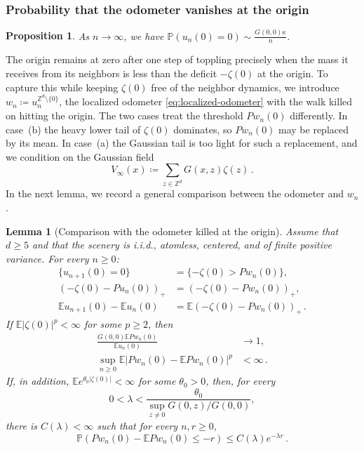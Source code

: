 \documentclass[11pt]{amsart}
\theoremstyle{plain}
\newtheorem{proposition}[theorem]{Proposition}
\newtheorem{lemma}[theorem]{Lemma}
\theoremstyle{definition}
\newcommand{\Z}{\mathbb{Z}}
\newcommand{\E}{\mathbb{E}}
\renewcommand{\P}{\mathbb{P}}
\begin{document}
\subsubsection{Probability that the odometer vanishes at the origin}
	\begin{proposition}\label{prop:dgt4-contact-asymptotics}
		As $n \to \infty$, we have $\P(u_n(0)=0)\sim\frac{G(0,0)\kappa}{n}$.
	\end{proposition}
	The origin remains at zero after one step of toppling precisely when the mass it receives from its neighbors
	is less than the deficit $-\zeta(0)$ at the origin. To capture this while
	keeping $\zeta(0)$ free of the neighbor dynamics, we introduce
	$w_n\coloneqq u_n^{\Z^d\setminus\{0\}}$, the localized odometer
	\eqref{eq:localized-odometer} with the walk killed on hitting the origin. The two cases treat the threshold $Pw_n(0)$ differently. In case~\textup{(b)} the
	heavy lower tail of $\zeta(0)$ dominates, so $Pw_n(0)$ may be replaced by its
	mean. In case~\textup{(a)} the Gaussian tail is too light for such a
	replacement, and we condition on the Gaussian field
	\begin{equation}\label{eq:dgt4-infinite-green-field}
		V_\infty(x)\coloneqq\sum_{z\in\Z^d}G(x,z)\zeta(z)\, .
	\end{equation}
	In the next lemma, we record a general comparison between the odometer and $w_n$.
\begin{lemma}[Comparison with the odometer killed at the origin]\label{lem:dgt4-origin-frozen}
	Assume that $d\geq5$ and that the scenery is i.i.d., atomless, centered,
	and of finite positive variance. For every $n\geq0$:
	\begin{equation}\label{eq:dgt4-origin-fixed-identities}
	\begin{aligned}
		\{u_{n+1}(0)=0\}
		&=\{-\zeta(0)>Pw_n(0)\},\\
		(-\zeta(0)-Pu_n(0))_+
		&=(-\zeta(0)-Pw_n(0))_+,\\
		\E u_{n+1}(0)-\E u_n(0)
		&=\E(-\zeta(0)-Pw_n(0))_+\, .
	\end{aligned}
	\end{equation}
	If $\E|\zeta(0)|^p<\infty$ for some $p\geq2$, then
	\begin{equation}\label{eq:dgt4-origin-fixed-mean}
	\begin{aligned}
		\frac{G(0,0)\E Pw_n(0)}{\E u_n(0)}
		&\longrightarrow1,\\
		\sup_{n\geq0}\E|Pw_n(0)-\E Pw_n(0)|^p
		&<\infty\, .
	\end{aligned}
	\end{equation}
	If, in addition, $\E e^{\theta_0|\zeta(0)|}<\infty$ for some
	$\theta_0>0$, then, for every
	\[
		0<\lambda<
		\frac{\theta_0}{
		\displaystyle\sup_{z\ne0}G(0,z)/G(0,0)},
	\]
	there is $C(\lambda)<\infty$ such that for every $n,r\geq0$,
	\begin{equation}\label{eq:dgt4-origin-frozen-lower-tail}
		\P\left(
		Pw_n(0)-\E Pw_n(0)\leq-r
		\right)
		\leq C(\lambda)e^{-\lambda r}\, .
	\end{equation}
\end{lemma}
\end{document}
